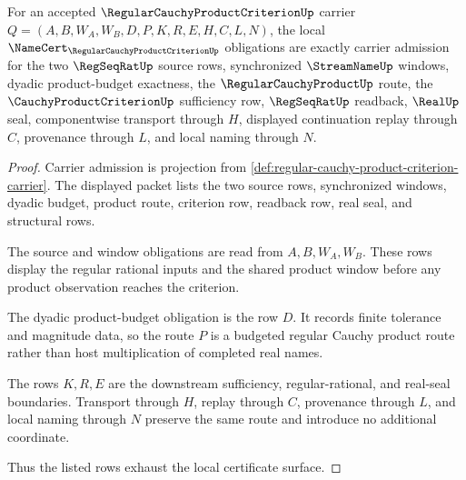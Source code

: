 \begin{theorem}
\label{thm:regular-cauchy-product-criterion-namecert-obligations}
For an accepted $\RegularCauchyProductCriterionUp$ carrier $Q=(A,B,W_A,W_B,D,P,K,R,E,H,C,L,N)$, the local $\NameCert_{\RegularCauchyProductCriterionUp}$ obligations are exactly carrier admission for the two $\RegSeqRatUp$ source rows, synchronized $\StreamNameUp$ windows, dyadic product-budget exactness, the $\RegularCauchyProductUp$ route, the $\CauchyProductCriterionUp$ sufficiency row, $\RegSeqRatUp$ readback, $\RealUp$ seal, componentwise transport through $H$, displayed continuation replay through $C$, provenance through $L$, and local naming through $N$.
\end{theorem}
\begin{proof}
Carrier admission is projection from \autoref{def:regular-cauchy-product-criterion-carrier}. The displayed packet lists the two source rows, synchronized windows, dyadic budget, product route, criterion row, readback row, real seal, and structural rows.

The source and window obligations are read from $A,B,W_A,W_B$. These rows display the regular rational inputs and the shared product window before any product observation reaches the criterion.

The dyadic product-budget obligation is the row $D$. It records finite tolerance and magnitude data, so the route $P$ is a budgeted regular Cauchy product route rather than host multiplication of completed real names.

The rows $K,R,E$ are the downstream sufficiency, regular-rational, and real-seal boundaries. Transport through $H$, replay through $C$, provenance through $L$, and local naming through $N$ preserve the same route and introduce no additional coordinate.

Thus the listed rows exhaust the local certificate surface.
\end{proof}

